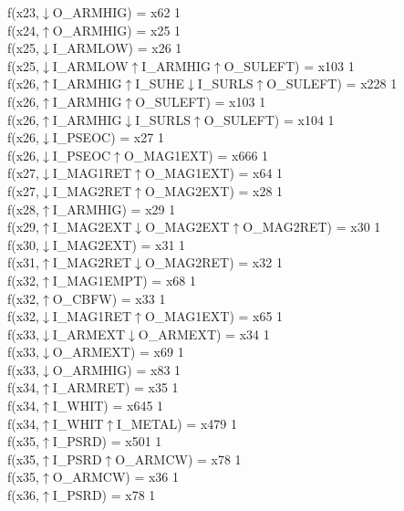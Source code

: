 f(x23,$\downarrow$O\_ARMHIG) = x62 {1} \\
f(x24,$\uparrow$O\_ARMHIG) = x25 {1} \\
f(x25,$\downarrow$I\_ARMLOW) = x26 {1} \\
f(x25,$\downarrow$I\_ARMLOW$\uparrow$I\_ARMHIG$\uparrow$O\_SULEFT) = x103 {1} \\
f(x26,$\uparrow$I\_ARMHIG$\uparrow$I\_SUHE$\downarrow$I\_SURLS$\uparrow$O\_SULEFT) = x228 {1} \\
f(x26,$\uparrow$I\_ARMHIG$\uparrow$O\_SULEFT) = x103 {1} \\
f(x26,$\uparrow$I\_ARMHIG$\downarrow$I\_SURLS$\uparrow$O\_SULEFT) = x104 {1} \\
f(x26,$\downarrow$I\_PSEOC) = x27 {1} \\
f(x26,$\downarrow$I\_PSEOC$\uparrow$O\_MAG1EXT) = x666 {1} \\
f(x27,$\downarrow$I\_MAG1RET$\uparrow$O\_MAG1EXT) = x64 {1} \\
f(x27,$\downarrow$I\_MAG2RET$\uparrow$O\_MAG2EXT) = x28 {1} \\
f(x28,$\uparrow$I\_ARMHIG) = x29 {1} \\
f(x29,$\uparrow$I\_MAG2EXT$\downarrow$O\_MAG2EXT$\uparrow$O\_MAG2RET) = x30 {1} \\
f(x30,$\downarrow$I\_MAG2EXT) = x31 {1} \\
f(x31,$\uparrow$I\_MAG2RET$\downarrow$O\_MAG2RET) = x32 {1} \\
f(x32,$\uparrow$I\_MAG1EMPT) = x68 {1} \\
f(x32,$\uparrow$O\_CBFW) = x33 {1} \\
f(x32,$\downarrow$I\_MAG1RET$\uparrow$O\_MAG1EXT) = x65 {1} \\
f(x33,$\downarrow$I\_ARMEXT$\downarrow$O\_ARMEXT) = x34 {1} \\
f(x33,$\downarrow$O\_ARMEXT) = x69 {1} \\
f(x33,$\downarrow$O\_ARMHIG) = x83 {1} \\
f(x34,$\uparrow$I\_ARMRET) = x35 {1} \\
f(x34,$\uparrow$I\_WHIT) = x645 {1} \\
f(x34,$\uparrow$I\_WHIT$\uparrow$I\_METAL) = x479 {1} \\
f(x35,$\uparrow$I\_PSRD) = x501 {1} \\
f(x35,$\uparrow$I\_PSRD$\uparrow$O\_ARMCW) = x78 {1} \\
f(x35,$\uparrow$O\_ARMCW) = x36 {1} \\
f(x36,$\uparrow$I\_PSRD) = x78 {1} \\
